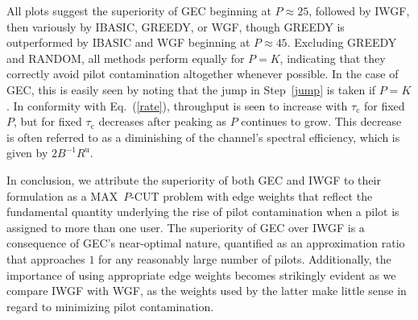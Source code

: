 \documentclass[]{IEEEtran}
\begin{document}
All plots suggest the superiority of GEC beginning at $P\approx 25$, followed
by IWGF, then variously by IBASIC, GREEDY, or WGF, though GREEDY is outperformed
by IBASIC and WGF beginning at $P\approx 45$. Excluding GREEDY and RANDOM, all
methods perform equally for $P=K$, indicating that they correctly avoid pilot
contamination altogether whenever possible. In the case of GEC, this is easily
seen by noting that the jump in Step~\ref{jump} is taken if $P=K$. In conformity
with Eq.~(\ref{rate}), throughput is seen to increase with $\tau_\mathrm{c}$ for
fixed $P$, but for fixed $\tau_\mathrm{c}$ decreases after peaking as $P$
continues to grow. This decrease is often referred to as a diminishing of the
channel's spectral efficiency, which is given by $2B^{-1}R^\mathrm{u}$.

In conclusion, we attribute the superiority of both GEC and IWGF to their
formulation as a MAX~$P$-CUT problem with edge weights that reflect the
fundamental quantity underlying the rise of pilot contamination when a pilot is
assigned to more than one user. The superiority of GEC over IWGF is a
consequence of GEC's near-optimal nature, quantified as an approximation ratio
that approaches $1$ for any reasonably large number of pilots. Additionally, the
importance of using appropriate edge weights becomes strikingly evident as we
compare IWGF with WGF, as the weights used by the latter make little sense in
regard to minimizing pilot contamination.



\end{document}
